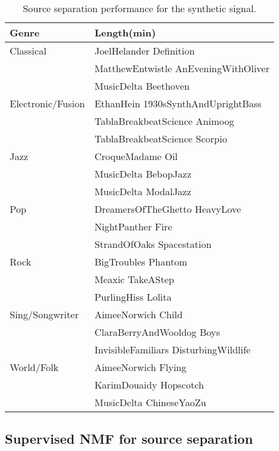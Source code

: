 \documentclass{article}
\begin{document}
\begin{table}
   
	\centering 
   \begin{tabular}{|l|l|}
   	\hline   
   Genre & Length(min)\\
  \hline
Classical  & JoelHelander Definition \\
 & MatthewEntwistle AnEveningWithOliver \\
 & MusicDelta Beethoven \\
  \hline
Electronic/Fusion & EthanHein 1930sSynthAndUprightBass\\
 & TablaBreakbeatScience Animoog\\
 & TablaBreakbeatScience Scorpio\\
	\hline
Jazz & CroqueMadame Oil\\
 & MusicDelta BebopJazz\\
 & MusicDelta ModalJazz \\
\hline
Pop &  DreamersOfTheGhetto HeavyLove \\
 & NightPanther Fire \\
 & StrandOfOaks Spacestation \\
\hline
Rock & BigTroubles Phantom\\
 & Meaxic TakeAStep \\
 & PurlingHiss Lolita \\
\hline
Sing/Songwriter	& AimeeNorwich Child\\
 & ClaraBerryAndWooldog Boys\\
 & InvisibleFamiliars DisturbingWildlife\\
\hline
World/Folk &AimeeNorwich Flying \\
 &KarimDouaidy Hopscotch \\
 & MusicDelta ChineseYaoZu\\
\hline

  
\end{tabular} 
\caption{\label{resultONMF2} Source separation performance for the synthetic signal.}


\end{table}
\vspace{-0.4cm}





\subsection{Supervised NMF for source separation}
\end{document}
